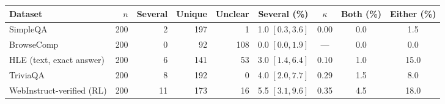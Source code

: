 \begin{tabular}{lrrrrcccc}
\toprule
Dataset & $n$ & Several & Unique & Unclear & Several (\%) & $\kappa$ & Both (\%) & Either (\%) \\
\midrule
SimpleQA & 200 & 2 & 197 & 1 & 1.0 {\scriptsize$[0.3,3.6]$} & 0.00 & 0.0 & 1.5 \\
BrowseComp & 200 & 0 & 92 & 108 & 0.0 {\scriptsize$[0.0,1.9]$} & --- & 0.0 & 0.0 \\
HLE (text, exact answer) & 200 & 6 & 141 & 53 & 3.0 {\scriptsize$[1.4,6.4]$} & 0.10 & 1.0 & 15.0 \\
TriviaQA & 200 & 8 & 192 & 0 & 4.0 {\scriptsize$[2.0,7.7]$} & 0.29 & 1.5 & 8.0 \\
WebInstruct-verified (RL) & 200 & 11 & 173 & 16 & 5.5 {\scriptsize$[3.1,9.6]$} & 0.35 & 4.5 & 18.0 \\
\bottomrule
\end{tabular}
